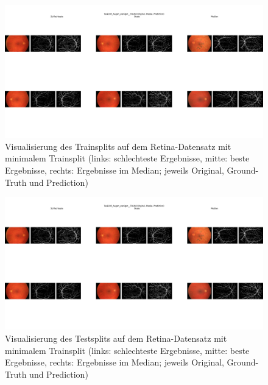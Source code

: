 \begin{figure}[H]
\centering
\includegraphics[height=0.35\textheight, width=\textwidth]{Pictures/nnUnet/Praxis/Task205-Augen-minimal-13-trainsamples/Vis-Train.png}
\caption{Visualisierung des Trainsplits auf dem Retina-Datensatz mit minimalem Trainsplit (links: schlechteste Ergebnisse, mitte: beste Ergebnisse, rechts: Ergebnisse im Median; jeweils Original, Ground-Truth und Prediction)}
\label{pic:Vis-Train_205}
\end{figure}


\begin{figure}[H]
\centering
\includegraphics[height=0.35\textheight, width=\textwidth]{Pictures/nnUnet/Praxis/Task205-Augen-minimal-13-trainsamples/Vis-Train.png}
\caption{Visualisierung des Testsplits auf dem Retina-Datensatz mit minimalem Trainsplit (links: schlechteste Ergebnisse, mitte: beste Ergebnisse, rechts: Ergebnisse im Median; jeweils Original, Ground-Truth und Prediction)}
\label{pic:Vis-Test_205}
\end{figure}





